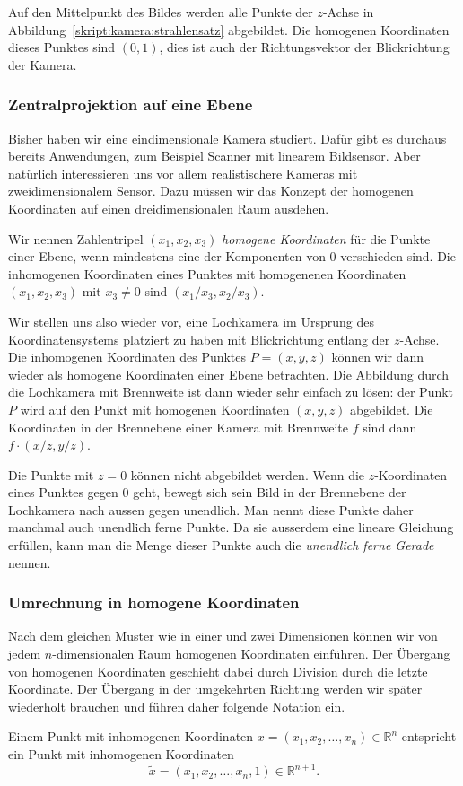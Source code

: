 Auf den Mittelpunkt des Bildes werden alle Punkte der $z$-Achse
in Abbildung~\ref{skript:kamera:strahlensatz} abgebildet.
Die homogenen Koordinaten dieses Punktes sind $(0,1)$, dies ist
auch der Richtungsvektor der Blickrichtung der Kamera.

\subsubsection{Zentralprojektion auf eine Ebene}
Bisher haben wir eine eindimensionale Kamera studiert.
Dafür gibt es durchaus bereits Anwendungen, zum Beispiel Scanner
mit linearem Bildsensor.
Aber natürlich interessieren uns vor allem realistischere Kameras
mit zweidimensionalem Sensor.
Dazu müssen wir das Konzept der homogenen Koordinaten auf einen
dreidimensionalen Raum ausdehen.

\begin{definition}
Wir nennen Zahlentripel $(x_1,x_2,x_3)$ {\em homogene Koordinaten}
für die Punkte einer Ebene, wenn mindestens eine der Komponenten von $0$
verschieden sind.
Die inhomogenen Koordinaten eines Punktes mit homogenenen Koordinaten
$(x_1,x_2,x_3)$ mit $x_3\ne 0$ sind $(x_1/x_3,x_2/x_3)$.
\end{definition}

Wir stellen uns also wieder vor, eine Lochkamera im Ursprung des
Koordinatensystems platziert zu haben mit Blickrichtung entlang der
$z$-Achse.
Die inhomogenen Koordinaten des Punktes $P=(x,y,z)$ können wir dann
wieder als homogene Koordinaten einer Ebene betrachten.
Die Abbildung durch die Lochkamera mit Brennweite ist dann wieder sehr
einfach zu lösen: der Punkt $P$ wird auf den Punkt mit homogenen Koordinaten
$(x,y,z)$ abgebildet.
Die Koordinaten in der Brennebene einer Kamera mit Brennweite $f$ sind dann
$f\cdot (x/z, y/z)$.

Die Punkte mit $z=0$ können nicht abgebildet werden.
Wenn die $z$-Koordinaten eines Punktes gegen $0$ geht, bewegt sich sein
Bild in der Brennebene der Lochkamera nach aussen gegen unendlich.
Man nennt diese Punkte daher manchmal auch unendlich ferne Punkte.
Da sie ausserdem eine lineare Gleichung erfüllen, kann man die Menge dieser
Punkte auch die {\em unendlich ferne Gerade} nennen.
%

\subsubsection{Umrechnung in homogene Koordinaten}
Nach dem gleichen Muster wie in einer und zwei Dimensionen
können wir von jedem $n$-dimensionalen Raum homogenen Koordinaten einführen.
Der Übergang von homogenen Koordinaten geschieht dabei durch Division
durch die letzte Koordinate.
Der Übergang in der umgekehrten Richtung werden wir später wiederholt
brauchen und führen daher folgende Notation ein.

\begin{definition}
Einem Punkt mit inhomogenen Koordinaten $x=(x_1,x_2,\dots,x_{n})\in\mathbb R^n$
entspricht ein Punkt mit inhomogenen Koordinaten
\[
\tilde x = (x_1,x_2,\dots,x_{n},1) \in \mathbb R^{n+1}.
\]
\end{definition}

